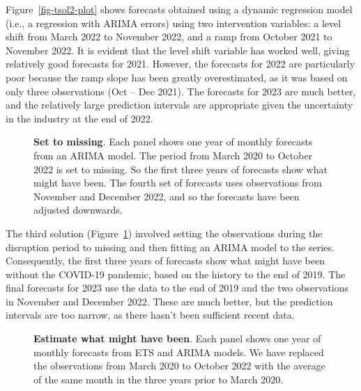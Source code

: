 \documentclass[
  11pt,
  a4paper,
]{article}
\begin{document}
Figure~\ref{fig-tsol2-plot} shows forecasts obtained using a dynamic
regression model (i.e., a regression with ARIMA errors) using two
intervention variables: a level shift from March 2022 to November 2022,
and a ramp from October 2021 to November 2022. It is evident that the
level shift variable has worked well, giving relatively good forecasts
for 2021. However, the forecasts for 2022 are particularly poor because
the ramp slope has been greatly overestimated, as it was based on only
three observations (Oct -- Dec 2021). The forecasts for 2023 are much
better, and the relatively large prediction intervals are appropriate
given the uncertainty in the industry at the end of 2022.

\begin{figure}[!b]


\caption{\label{fig-tsol3-plot}\textbf{Set to missing}. Each panel shows
one year of monthly forecasts from an ARIMA model. The period from March
2020 to October 2022 is set to missing. So the first three years of
forecasts show what might have been. The fourth set of forecasts uses
observations from November and December 2022, and so the forecasts have
been adjusted downwards.}

\end{figure}%

The third solution (Figure~\ref{fig-tsol3-plot}) involved setting the
observations during the disruption period to missing and then fitting an
ARIMA model to the series. Consequently, the first three years of
forecasts show what might have been without the COVID-19 pandemic, based
on the history to the end of 2019. The final forecasts for 2023 use the
data to the end of 2019 and the two observations in November and
December 2022. These are much better, but the prediction intervals are
too narrow, as there hasn't been sufficient recent data.

\begin{figure}[!b]


\caption{\label{fig-tsol4-plot}\textbf{Estimate what might have been}.
Each panel shows one year of monthly forecasts from ETS and ARIMA
models. We have replaced the observations from March 2020 to October
2022 with the average of the same month in the three years prior to
March 2020.}

\end{figure}%
\end{document}
